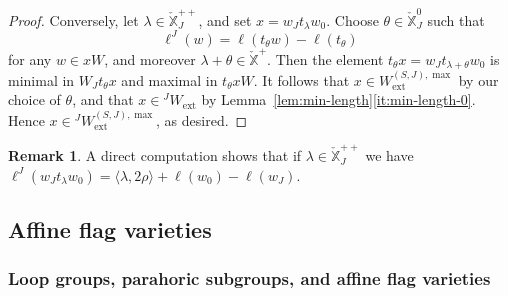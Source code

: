 \documentclass[11pt]{amsart}
\numberwithin{equation}{section}
\theoremstyle{plain}
\theoremstyle{definition}
\newtheorem{rmk}[thm]{Remark}
\newcommand{\X}{{\mathbb X}}
\newcommand{\Xd}{\check{\X}}
\newcommand{\Phis}{\Phi^{\mathrm{s}}}
\newcommand{\ex}{\mathrm{ext}}
\newcommand{\comp}{\mathrm{c}}
\begin{document}
\begin{proof}
Conversely, let $\lambda \in \Xd_J^{++}$, and set $x = w_J t_\lambda w_0$. Choose $\theta \in \Xd_J^0$ such that 
\[
\ell^J(w) = \ell(t_\theta w)-\ell(t_\theta)
\]
for any $w \in x W$, and moreover
$\lambda+\theta \in \Xd^+$. Then the element $t_\theta x = w_J t_{\lambda + \theta} w_0$ is minimal in $W_J t_\theta x$ and maximal in $t_\theta x W$. It follows that $x \in W_\ex^{(S,J),\max}$ by our choice of $\theta$, and that $x \in {}^J W_\ex$ by Lemma~\ref{lem:min-length}\eqref{it:min-length-0}.
Hence $x \in {}^JW_\ex^{(S,J),\max}$, as desired.
\end{proof}

\begin{rmk}
\label{rmk:JSJw-length}
A direct computation shows that if $\lambda\in \Xd_J^{++}$ we have $\ell^J(w_Jt_\lambda w_0)= \langle \lambda, 2\rho \rangle + \ell(w_0) - \ell(w_J)$.
\end{rmk}

\subsection{Affine flag varieties} 

\subsubsection{Loop groups, parahoric subgroups, and affine flag varieties} 
\label{sss:def-Fl}
\end{document}
